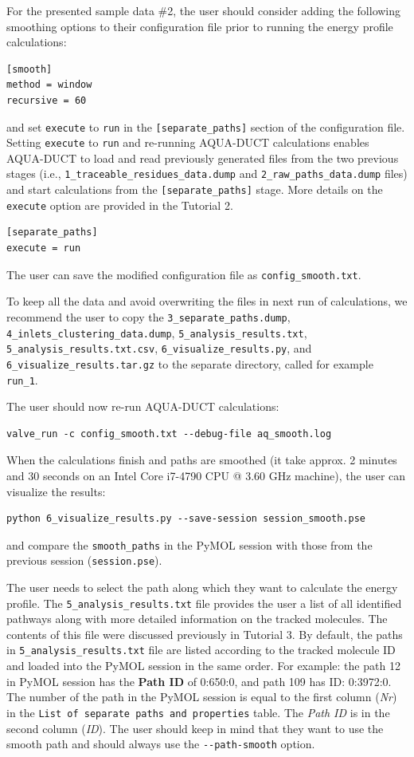 \documentclass[9pt,tutorial]{livecoms}
\begin{document}
For the presented sample data \#2, the user should consider adding the following smoothing options to their configuration file prior to running the energy profile calculations:
\begin{lstlisting}
[smooth]
method = window
recursive = 60
\end{lstlisting}
and set \texttt{execute} to \texttt{run} in the \texttt{[separate\_paths]} section of the configuration file. Setting \texttt{execute} to \texttt{run} and re-running AQUA-DUCT calculations enables AQUA-DUCT to load and read previously generated files from the two previous stages (i.e., \texttt{1\_traceable\_residues\_data.dump} and \texttt{2\_raw\_paths\_data.dump} files) and start calculations from the \texttt{[separate\_paths]} stage. More details on the \texttt{execute} option are provided in the Tutorial 2. 
\begin{lstlisting}
[separate_paths]
execute = run
\end{lstlisting}
The user can save the modified configuration file as \texttt{config\_smooth.txt}.

To keep all the data and avoid overwriting the files in next run of calculations, we recommend the user to copy the \texttt{3\_separate\_paths.dump}, \texttt{4\_inlets\_clustering\_data.dump}, \texttt{5\_analysis\_results.txt}, \texttt{5\_analysis\_results.txt.csv}, \texttt{6\_visualize\_results.py}, and \texttt{6\_visualize\_results.tar.gz} to the separate directory, called for example \texttt{run\_1}.

The user should now re-run AQUA-DUCT calculations:
\begin{lstlisting}
valve_run -c config_smooth.txt --debug-file aq_smooth.log
\end{lstlisting}

When the calculations finish and paths are smoothed (it take approx. 2 minutes and 30 seconds on an Intel Core i7-4790 CPU @ 3.60 GHz machine), the user can visualize the results:
\begin{lstlisting}
python 6_visualize_results.py --save-session session_smooth.pse
\end{lstlisting}
and compare the \texttt{smooth\_paths} in the PyMOL session with those from the previous session (\texttt{session.pse}). 

The user needs to select the path along which they want to calculate the energy profile. The \texttt{5\_analysis\_results.txt} file provides the user a list of all identified pathways along with more detailed information on the tracked molecules. The contents of this file were discussed previously in Tutorial 3. By default, the paths in \texttt{5\_analysis\_results.txt} file are listed according to the tracked molecule ID and loaded into the PyMOL session in the same order. For example: the path 12 in PyMOL session has the \textbf{Path ID} of 0:650:0, and path 109 has ID: 0:3972:0. The number of the path in the PyMOL session is equal to the first column (\emph{Nr}) in the \texttt{List of separate paths and properties} table. The \textit{Path ID} is in the second column (\emph{ID}). The user should keep in mind that they want to use the smooth path and should always use the \texttt{-{}-path-smooth} option.
\end{document}
